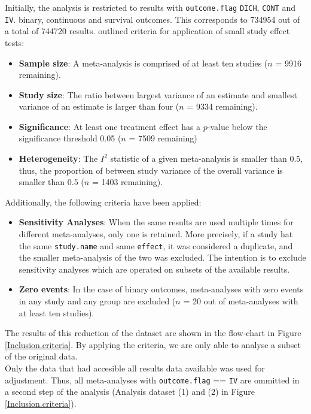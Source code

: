 \documentclass[11pt,a4paper,twoside]{book}\usepackage[]{graphicx}\usepackage[]{color}
\begin{document}
Initially, the analysis is restricted to results with \texttt{outcome.flag} \texttt{DICH}, \texttt{CONT} and \texttt{IV}. binary, continuous and survival outcomes. This corresponds to 734954 out of a total of 744720 results.
\citet{Ioannidis2007} outlined criteria for application of small study effect tests:
\begin{itemize}
\item \textbf{Sample size}: A meta-analysis is comprised of at least ten studies ($n$ = 9916 remaining). 
\item \textbf{Study size}: The ratio between largest variance of an estimate and smallest variance of an estimate is larger than four ($n$ = 9334 remaining).
\item \textbf{Significance}: At least one treatment effect has a $p$-value below the significance threshold 0.05 ($n$ = 7509 remaining)
\item \textbf{Heterogeneity}: The $I^2$ statistic of a given meta-analysis is smaller than 0.5, thus, the proportion of between study variance of the overall variance is smaller than 0.5 ($n$ = 1403 remaining).
\end{itemize}
Additionally, the following criteria have been applied:
\begin{itemize}
\item \textbf{Sensitivity Analyses}: When the same results are used multiple times for different meta-analyses, only one is retained. More precisely, if a study hat the same \texttt{study.name} and same \texttt{effect}, it was considered a duplicate, and the smaller meta-analysis of the two was excluded. The intention is to exclude sensitivity analyses which are operated on subsets of the available results.
\item \textbf{Zero events}: In the case of binary outcomes, meta-analyses with zero events in any study and any group are excluded ($n$ = 20 out of meta-analyses with at least ten studies).
\end{itemize}

The results of this reduction of the dataset are shown in the flow-chart in Figure \ref{Inclusion.criteria}. By applying the criteria, we are only able to analyse a subset of the original data. \\
Only the data that had accesible all results data available was used for adjustment. Thus, all meta-analyses with \texttt{outcome.flag} == \texttt{IV} are ommitted in a second step of the analysis (Analysis dataset (1) and (2) in Figure \ref{Inclusion.criteria}).
\end{document}
